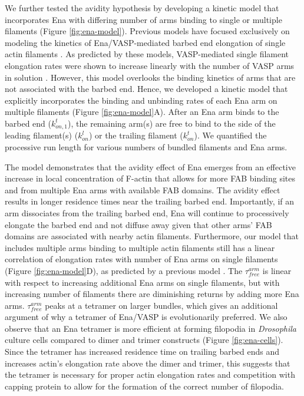 We further tested the avidity hypothesis by developing a kinetic model that incorporates Ena with differing number of arms binding to single or multiple filaments (Figure \ref{fig:ena-model}). Previous models have focused exclusively on modeling the kinetics of Ena/VASP-mediated barbed end elongation of single actin filaments \citep{hansen_vasp_2010, breitsprecher_molecular_2011, bruhmann_distinct_2017}. As predicted by these models, VASP-mediated single filament elongation rates were shown to increase linearly with the number of VASP arms in solution \citep{breitsprecher_molecular_2011}. However, this model overlooks the binding kinetics of arms that are not associated with the barbed end. Hence, we developed a kinetic model that explicitly incorporates the binding and unbinding rates of each Ena arm on multiple filaments (Figure \ref{fig:ena-model}A). After an Ena arm binds to the barbed end ($k_{on,1}^{t}$), the remaining arm(s) are free to bind to the side of the leading filament(s) ($k_{on}^{l}$) or the trailing filament ($k_{on}^{t}$). We quantified the processive run length for various numbers of bundled filaments and Ena arms. 

The model demonstrates that the avidity effect of Ena emerges from an effective increase in local concentration of F-actin that allows for more FAB binding sites and from multiple Ena arms with available FAB domains. The avidity effect results in longer residence times near the trailing barbed end. Importantly, if an arm dissociates from the trailing barbed end, Ena will continue to processively elongate the barbed end and not diffuse away given that other arms' FAB domains are associated with nearby actin filaments. Furthermore, our model that includes multiple arms binding to multiple actin filaments still has a linear correlation of elongation rates with number of Ena arms on single filaments (Figure \ref{fig:ena-model}D), as predicted by a previous model \citep{breitsprecher_molecular_2011}. The $\tau_{free}^{arm}$ is linear with respect to increasing additional Ena arms on single filaments, but with increasing number of filaments there are diminishing returns by adding more Ena arms. $\tau_{free}^{arm}$ peaks at a tetramer on larger bundles, which gives an additional argument of why a tetramer of Ena/VASP is evolutionarily preferred. We also observe that an Ena tetramer is more efficient at forming filopodia in \textit{Drosophila} culture cells compared to dimer and trimer constructs (Figure \ref{fig:ena-cells}). Since the tetramer has increased residence time on trailing barbed ends and increases actin's elongation rate above the dimer and trimer, this suggests that the tetramer is necessary for proper actin elongation rates and competition with capping protein to allow for the formation of the correct number of filopodia. 

